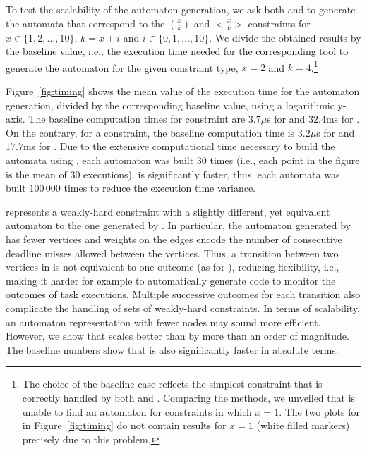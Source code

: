 To test the scalability of the automaton generation, we ask both \tool{} and \toolLinsenmayer{} to generate the automata that correspond to the \tAH{} $\binom{x}{k}$ and \tRH{} $\genfrac{<}{>}{0pt}{}{x}{k}$ constraints for $x \in \{1,2,\dots,10\}$, $k=x+i$ and $i \in \{0,1,\dots,10\}$.
We divide the obtained results by the baseline value, i.e., the execution time needed for the corresponding tool to generate the automaton for the given constraint type, $x=2$ and $k=4$.\footnote{The choice of the baseline case reflects the simplest constraint that is correctly handled by both \tool{} and \toolLinsenmayer{}. Comparing the methods, we unveiled that \toolLinsenmayer{} is unable to find an automaton for constraints in which $x=1$. The two plots for \toolLinsenmayer{} in Figure~\ref{fig:timing} do not contain results for $x=1$ (white filled markers) precisely due to this problem.}

Figure~\ref{fig:timing} shows the mean value of the execution time for the automaton generation, divided by the corresponding baseline value, using a logarithmic y-axis.
The baseline computation times for \tAH{} constraint are $3.7 \mu$s for \tool{} and   $32.4$ms for \toolLinsenmayer{}. On the contrary, for a \tRH{} constraint, the baseline computation time is $3.2 \mu$s for \tool{} and $17.7$ms for \toolLinsenmayer{}.
Due to the extensive computational time necessary to build the automata using \toolLinsenmayer{}, each automaton was built $30$ times (i.e., each point in the figure is the mean of $30$ executions).
\tool{} is significantly faster, thus, each automata was built $100\,000$ times to reduce the execution time variance.

\toolLinsenmayer{} represents a weakly-hard constraint with a slightly different, yet equivalent automaton to the one generated by \tool{}.
In particular, the automaton generated by \toolLinsenmayer{} has fewer vertices and weights on the edges encode the number of consecutive deadline misses allowed between the vertices.
Thus, a transition between two vertices in \toolLinsenmayer{} is not equivalent to one outcome (as for \tool{}), reducing flexibility, i.e., making it harder for example to automatically generate code to monitor the outcomes of task executions.
Multiple successive outcomes for each transition also complicate the handling of sets of weakly-hard constraints.
In terms of scalability, an automaton representation with fewer nodes may sound more efficient.
However, we show that \tool{} scales better than \toolLinsenmayer{} by more than an order of magnitude.
The baseline numbers show that \tool{} is also significantly faster in absolute terms.

